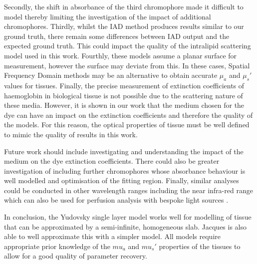 %
Secondly, the shift in absorbance of the third chromophore made it difficult to model thereby limiting the investigation of the impact of additional chromophores.
%
Thirdly, whilst the IAD method produces results similar to our ground truth, there remain some differences between IAD output and the expected ground truth.
This could impact the quality of the intralipid scattering model used in this work.
%
Fourthly, these models assume a planar surface for measurement, however the surface may deviate from this. In these cases, Spatial Frequency Domain methods may be an alternative to obtain accurate $\mu_a$ and $\mu_s'$ values for tissues\cite{Gioux2019}. 
Finally, the precise measurement of extinction coefficients of haemoglobin in biological tissue is not possible due to the scattering nature of these media.
However, it is shown in our work that the medium chosen for the dye can have an impact on the extinction coefficients and therefore the quality of the models. For this reason, the optical properties of tissue must be well defined to mimic the quality of results in this work.

Future work should include 
investigating and understanding the impact of the medium on the dye extinction coefficients.
There could also be greater investigation of including further chromophores whose absorbance behaviour is well modelled and optimisation of the fitting region. 
Finally, similar analyses could be conducted in other wavelength ranges including the near infra-red range which can also be used for perfusion analysis with bespoke light sources \cite{Hummler2020}.

In conclusion, the Yudovsky single layer model works well for modelling of tissue that can be approximated by a semi-infinite, homogeneous slab. Jacques is also able to well approximate this with a simpler model. All models require appropriate prior knowledge of the $mu_a$ and $mu_s'$ properties of the tissues to allow for a good quality of parameter recovery.

